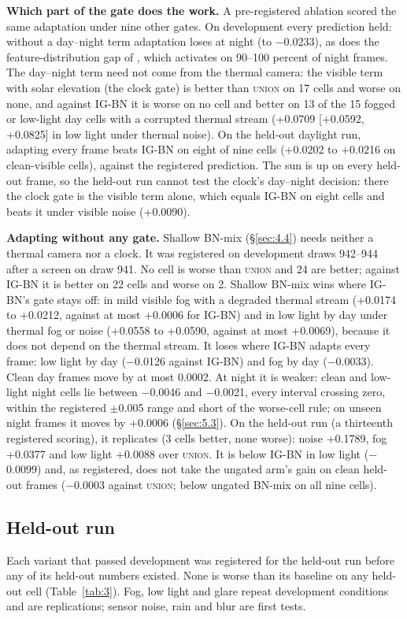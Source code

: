 \documentclass[10pt]{article}
\begin{document}
\textbf{Which part of the gate does the work.} A pre-registered ablation scored the same adaptation under nine other gates. On development every prediction held: without a day--night term adaptation loses at night (to $-$0.0233), as does the feature-distribution gap of \citet{yoo2024what}, which activates on 90--100 percent of night frames. The day--night term need not come from the thermal camera: the visible term with solar elevation (the clock gate) is better than \textsc{union} on 17 cells and worse on none, and against IG-BN it is worse on no cell and better on 13 of the 15 fogged or low-light day cells with a corrupted thermal stream (+0.0709 [+0.0592, +0.0825] in low light under thermal noise). On the held-out daylight run, adapting every frame beats IG-BN on eight of nine cells (+0.0202 to +0.0216 on clean-visible cells), against the registered prediction. The sun is up on every held-out frame, so the held-out run cannot test the clock's day--night decision: there the clock gate is the visible term alone, which equals IG-BN on eight cells and beats it under visible noise (+0.0090).

\textbf{Adapting without any gate.} Shallow BN-mix (\S\ref{sec:4.4}) needs neither a thermal camera nor a clock. It was registered on development draws 942--944 after a screen on draw 941. No cell is worse than \textsc{union} and 24 are better; against IG-BN it is better on 22 cells and worse on 2. Shallow BN-mix wins where IG-BN's gate stays off: in mild visible fog with a degraded thermal stream (+0.0174 to +0.0212, against at most +0.0006 for IG-BN) and in low light by day under thermal fog or noise (+0.0558 to +0.0590, against at most +0.0069), because it does not depend on the thermal stream. It loses where IG-BN adapts every frame: low light by day ($-$0.0126 against IG-BN) and fog by day ($-$0.0033). Clean day frames move by at most 0.0002. At night it is weaker: clean and low-light night cells lie between $-$0.0046 and $-$0.0021, every interval crossing zero, within the registered $\pm$0.005 range and short of the worse-cell rule; on unseen night frames it moves by +0.0006 (\S\ref{sec:5.3}). On the held-out run (a thirteenth registered scoring), it replicates (3 cells better, none worse): noise +0.1789, fog +0.0377 and low light +0.0088 over \textsc{union}. It is below IG-BN in low light ($-$0.0099) and, as registered, does not take the ungated arm's gain on clean held-out frames ($-$0.0003 against \textsc{union}; below ungated BN-mix on all nine cells).

\subsection{Held-out run}\label{sec:5.2}
Each variant that passed development was registered for the held-out run before any of its held-out numbers existed. None is worse than its baseline on any held-out cell (Table~\ref{tab:3}). Fog, low light and glare repeat development conditions and are replications; sensor noise, rain and blur are first tests.
\end{document}
